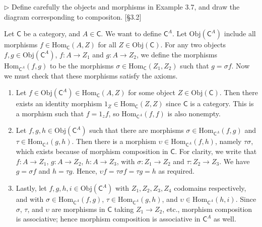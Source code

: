 \documentclass[12pt,letterpaper,boxed]{hmcpset}
\newcommand{\Obj}{\mathrm{Obj}}
\newcommand{\Hom}{\mathrm{Hom}}
\newcommand{\C}{\mathbb{C}}
\begin{document}
\begin{problem}[3.7]
	$\rhd$ Define carefully the objects and morphisms in Example 3.7, and draw the
	diagram corresponding to compositon. [\S 3.2]
\end{problem}
\begin{solution}
	\def \C {\mathsf{C}}
	\def \CA {\mathsf{C}^A}
	
	Let $\mathsf{C}$ be a category, and $A\in\mathsf{C}$. We want to define ${\mathsf{C}^A}$. Let $\Obj({\mathsf{C}^A})$
	include all morphisms $f\in\Hom_\mathsf{C}(A,Z)$ for all $Z\in\Obj(\mathsf{C})$. For any two
	objects $f,g\in\Obj({\mathsf{C}^A})$, $f:A\to Z_1$ and $g:A\to Z_2$, we define the
	morphisms $\Hom_{\mathsf{C}^A}(f,g)$ to be the morphisms $\sigma\in\Hom_\mathsf{C}(Z_1, Z_2)$ such
	that $g=\sigma f$. Now we must check that these morphisms satisfy the axioms.
	
	\begin{enumerate}
		\item Let $f\in\Obj({\mathsf{C}^A})\in\Hom_\mathsf{C}(A,Z)$ for some object $Z\in\Obj(\mathsf{C})$. Then
		there exists an identity morphism $1_Z\in\Hom_\mathsf{C}(Z,Z)$ since $\mathsf{C}$ is a category.
		This is a morphism such that $f=1_zf$, so $\Hom_{\mathsf{C}^A}(f,f)$ is also nonempty.
		
		\item Let $f,g,h\in\Obj({\mathsf{C}^A})$ such that there are morphisms
		$\sigma\in\Hom_{\mathsf{C}^A}(f,g)$ and $\tau\in\Hom_{\mathsf{C}^A}(g,h)$. Then there is a morphism
		$\upsilon\in\Hom_{\mathsf{C}^A}(f,h)$, namely $\tau\sigma$, which exists because of
		morphism composition in $\mathsf{C}$. For clarity, we write that  $f:A\to Z_1$, $g:A\to
		Z_2$, $h:A\to Z_3$, with $\sigma:Z_1\to Z_2$ and $\tau:Z_2\to Z_3$. We have
		$g=\sigma f$ and $h=\tau g$. Hence, $\upsilon f = \tau\sigma f = \tau g = h$ as
		required.
		
		\item Lastly, let $f,g,h,i\in\Obj({\mathsf{C}^A})$ with $Z_1, Z_2, Z_3, Z_4$ codomains
		respectively, and with $\sigma\in\Hom_{\mathsf{C}^A}(f,g)$, $\tau\in\Hom_{\mathsf{C}^A}(g,h)$, and
		$\upsilon\in\Hom_{\mathsf{C}^A}(h,i)$. Since $\sigma$, $\tau$, and $\upsilon$ are morphisms
		in $\mathsf{C}$ taking $Z_1\to Z_2$, etc., morphism composition is associative; hence
		morphism composition is associative in ${\mathsf{C}^A}$ as well.
	\end{enumerate}
\end{solution}
\end{document}
